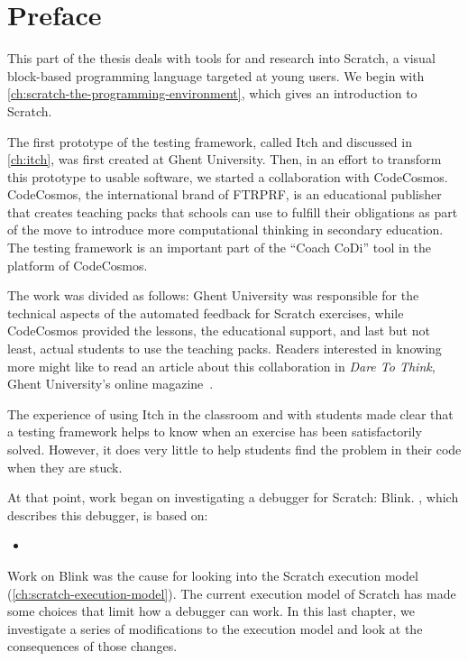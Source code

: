 \documentclass[./main]{subfiles}
\begin{document}
\chapter*{Preface}

This part of the thesis deals with tools for and research into Scratch, a visual block-based programming language targeted at young users.
We begin with \cref{ch:scratch-the-programming-environment}, which gives an introduction to Scratch.

The first prototype of the testing framework, called Itch and discussed in \cref{ch:itch}, was first created at Ghent University.
Then, in an effort to transform this prototype to usable software, we started a collaboration with CodeCosmos.
CodeCosmos, the international brand of FTRPRF, is an educational publisher that creates teaching packs that schools can use to fulfill their obligations as part of the move to introduce more computational thinking in secondary education.
The testing framework is an important part of the ``Coach CoDi'' tool in the platform of CodeCosmos.

The work was divided as follows: Ghent University was responsible for the technical aspects of the automated feedback for Scratch exercises, while CodeCosmos provided the lessons, the educational support, and last but not least, actual students to use the teaching packs.
Readers interested in knowing more might like to read an article about this collaboration in \textit{Dare To Think}, Ghent University's online magazine~\autocite{daretothinkCoachCoDiMotivationboosting2023}.

The experience of using Itch in the classroom and with students made clear that a testing framework helps to know when an exercise has been satisfactorily solved.
However, it does very little to help students find the problem in their code when they are stuck.

At that point, work began on investigating a debugger for Scratch: Blink.
, which describes this debugger, is based on:

\begin{itemize}
    \item {}
\end{itemize}

Work on Blink was the cause for looking into the Scratch execution model (\cref{ch:scratch-execution-model}).
The current execution model of Scratch has made some choices that limit how a debugger can work.
In this last chapter, we investigate a series of modifications to the execution model and look at the consequences of those changes.
\end{document}
